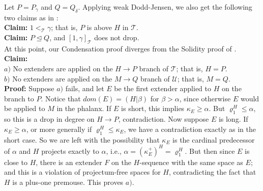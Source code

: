 \documentclass[12pt]{article}
\begin{document}
Let $P = P_\gamma$ and $Q = Q_\delta$.  Applying weak Dodd-Jensen, we also get the following two claims as in \cite{FSPIPM}:\\

\textbf{Claim:} $1 <_\mathscr{T} \gamma$; that is, $P$ is above $H$ in $\mathscr{T}$.\\

\textbf{Claim:} $P \unlhd Q$, and $[1, \gamma ]_\mathscr{T}$ does not drop.\\


At this point, our Condensation proof diverges from the Solidity proof of \cite{FSPIPM}.\\



\textbf{Claim:}\\

\indent \indent $a)$ No extenders are applied on the $H \longrightarrow P$ branch of $\mathscr{T}$; that is, $H = P$.\\

\indent \indent $b)$ No extenders are applied on the $M \longrightarrow Q$ branch of $\mathscr{U}$; that is, $M = Q$.\\

\indent \indent \textbf{Proof:} Suppose $a)$ fails, and let $E$ be the first extender applied to $H$ on the branch to $P$.  Notice that $dom (E) = (H | \beta )$ for $\beta > \alpha$, since otherwise $E$ would be applied to $M$ in the phalanx.  If $E$ is short, this implies $\kappa_E \geq \alpha$.  But $\varrho_1^H \leq \alpha$, so this is a drop in degree on $H \longrightarrow P$, contradiction.  Now suppose $E$ is long.  If $\kappa_E \geq \alpha$, or more generally if $\varrho_1^H \leq \kappa_E$, we have a contradiction exactly as in the short case.  So we are left with the possibility that $\kappa_E$ is the cardinal predecessor of $\alpha$ and $H$ projects exactly to $\alpha$, i.e., $\alpha = ( \kappa_E^+ )^H = \varrho_1^H$.  But then since $E$ is close to $H$, there is an extender $F$ on the $H$-sequence with the same space as $E$; and this is a violation of projectum-free spaces for $H$, contradicting the fact that $H$ is a plus-one premouse.  This proves $a)$.\\
\end{document}

